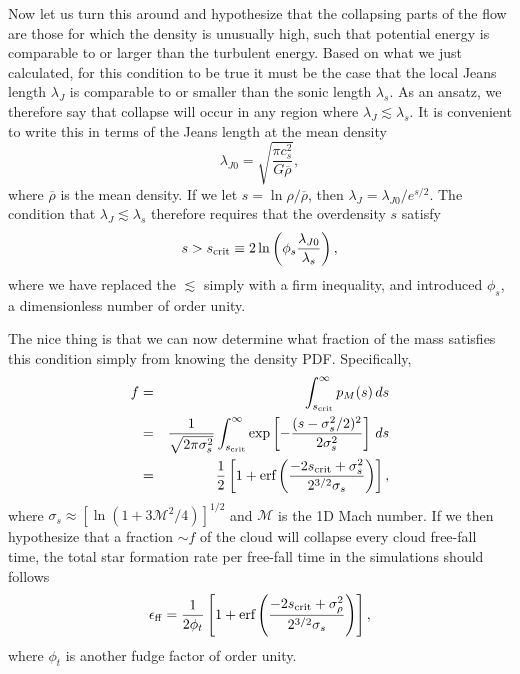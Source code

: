 Now let us turn this around and hypothesize that the collapsing parts of the flow are those for which the density is unusually high, such that potential energy is comparable to or larger than the turbulent energy. Based on what we just calculated, for this condition to be true it must be the case that the local Jeans length $\lambda_J$ is comparable to or smaller than the sonic length $\lambda_s$. As an ansatz, we therefore say that collapse will occur in any region where $\lambda_J \lesssim \lambda_s$. It is convenient to write this in terms of the Jeans length at the mean density
\begin{equation}
\lambda_{J0}=\sqrt{\frac{\pi c_s^2}{G\overline{\rho}}},
\end{equation}
where $\overline{\rho}$ is the mean density. If we let $s = \ln \rho/\overline{\rho}$, then $\lambda_J = \lambda_{J0}/e^{s/2}$. The condition that $\lambda_J \lesssim \lambda_s$ therefore requires that the overdensity $s$ satisfy
\begin{equation}
s > s_{\rm crit} \equiv 2 \ln \left(\phi_s \frac{\lambda_{J0}}{\lambda_s}\right),
\end{equation}
where we have replaced the $\lesssim$ simply with a firm inequality, and introduced $\phi_s$, a dimensionless number of order unity.

The nice thing is that we can now determine what fraction of the mass satisfies this condition simply from knowing the density PDF. Specifically,
\begin{eqnarray}
f & = & \int_{s_{\rm crit}}^\infty p_M(s) \,ds \\
& = & \frac{1}{\sqrt{2\pi \sigma_s^2}}
\int_{s_{\rm crit}}^\infty \exp\left[-\frac{(s -\sigma_s^2/2)^2}{2\sigma_s^2}\right] \, ds \\
& = & \frac{1}{2} \left[1+\mbox{erf}\left(\frac{-2 s_{\rm crit}+\sigma_s^2}{2^{3/2}\sigma_s}\right)\right],
\end{eqnarray}
where $\sigma_s \approx [\ln(1+3\mathcal{M}^2/4)]^{1/2}$ and $\mathcal{M}$ is the 1D Mach number. If we then hypothesize that a fraction $\sim f$ of the cloud will collapse every cloud free-fall time, the total star formation rate per free-fall time in the simulations should follows
\begin{equation}
\epsilon_{\rm ff} = \frac{1}{2 \phi_t} \left[1+\mbox{erf}\left(\frac{-2 s_{\rm crit}+\sigma_{\rho}^2}{2^{3/2}\sigma_s}\right)\right],
\end{equation}
where $\phi_t$ is another fudge factor of order unity.

